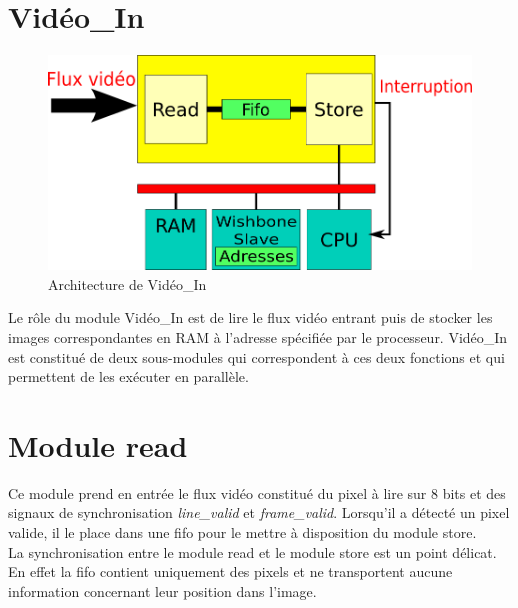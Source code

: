 \documentclass[a4paper,12pt]{report}
\begin{document}
{{	 \section{Vidéo\_In}

	 \begin{figure}[!h]
		\centering
		\includegraphics[scale = 0.5]{video_in.png}
	 \caption{Architecture de Vidéo\_In}
	 \end{figure}

	 Le rôle du module Vidéo\_In est de lire le flux vidéo entrant puis de stocker les images correspondantes en RAM à l'adresse spécifiée par le processeur.
		Vidéo\_In est constitué de deux sous-modules qui correspondent à ces deux fonctions et qui permettent de les exécuter en parallèle.


		\section*{Module read}
	 Ce module prend en entrée le flux vidéo constitué du pixel à lire sur 8 bits et des signaux de synchronisation \emph{line\_valid} et \emph{frame\_valid}.
		Lorsqu'il a détecté un pixel valide, il le place dans une fifo pour le mettre à disposition du module store.\\
		La synchronisation entre le module read et le module store est un point délicat.
		En effet la fifo contient uniquement des pixels et ne transportent aucune information concernant leur position dans l'image.

}}
\end{document}

